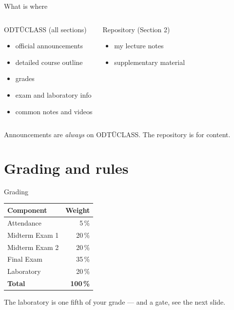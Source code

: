 \documentclass[11pt,aspectratio=169]{beamer}
\newcommand{\mysection}{Section 2}
\begin{document}
\begin{frame}{What is where}
  \begin{columns}[T,onlytextwidth]
      \begin{block}{ODTÜCLASS (all sections)}
        \small
        \begin{itemize}
          \item official announcements
          \item detailed course outline
          \item grades
          \item exam and laboratory info
          \item common notes and videos
        \end{itemize}
      \end{block}
      \begin{block}{Repository (\mysection)}
        \small
        \begin{itemize}
          \item my lecture notes
          \item supplementary material
        \end{itemize}
      \end{block}
  \end{columns}
  \vfill
  \centering\small\color{metugray}
  Announcements are \emph{always} on ODTÜCLASS. The repository is for content.
\end{frame}

\section{Grading and rules}
\begin{frame}{Grading}
  \begin{center}
  \begin{tabular}{L{6cm} r}
    \toprule
    \textbf{Component} & \textbf{Weight}\\
    \midrule
    Attendance       & 5\,\%\\
    Midterm Exam 1   & 20\,\%\\
    Midterm Exam 2   & 20\,\%\\
    Final Exam       & 35\,\%\\
    Laboratory       & 20\,\%\\
    \midrule
    \textbf{Total}   & \textbf{100\,\%}\\
    \bottomrule
  \end{tabular}
  \end{center}
  \vfill
  \centering\small\color{metugray}
  The laboratory is one fifth of your grade --- and a gate, see the next slide.
\end{frame}
\end{document}
